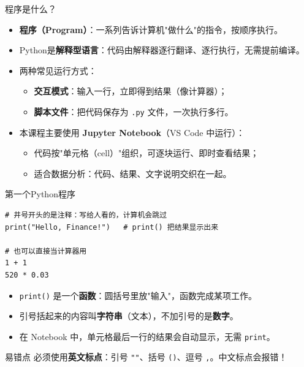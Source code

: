 \documentclass[9pt]{ctexbeamer}
\begin{document}
\begin{frame}{程序是什么？}
	\begin{itemize}
		\item \textbf{程序（Program）}：一系列告诉计算机"做什么"的指令，按顺序执行。
		\item Python是\textbf{解释型语言}：代码由解释器逐行翻译、逐行执行，无需提前编译。
		\item 两种常见运行方式：
		\begin{itemize}
			\item \textbf{交互模式}：输入一行，立即得到结果（像计算器）；
			\item \textbf{脚本文件}：把代码保存为 \texttt{.py} 文件，一次执行多行。
		\end{itemize}
		\item 本课程主要使用 \textbf{Jupyter Notebook}（VS Code 中运行）：
		\begin{itemize}
			\item 代码按"单元格（cell）"组织，可逐块运行、即时查看结果；
			\item 适合数据分析：代码、结果、文字说明交织在一起。
		\end{itemize}
	\end{itemize}
\end{frame}

\begin{frame}[fragile]{第一个Python程序}
	\begin{lstlisting}
# 井号开头的是注释：写给人看的，计算机会跳过
print("Hello, Finance!")   # print() 把结果显示出来

# 也可以直接当计算器用
1 + 1
520 * 0.03
\end{lstlisting}
	\begin{itemize}
		\item \texttt{print()} 是一个\textbf{函数}：圆括号里放"输入"，函数完成某项工作。
		\item 引号括起来的内容叫\textbf{字符串}（文本），不加引号的是\textbf{数字}。
		\item 在 Notebook 中，单元格最后一行的结果会自动显示，无需 \texttt{print}。
	\end{itemize}
	\begin{alertblock}{易错点}
		必须使用\textbf{英文标点}：引号 \texttt{""}、括号 \texttt{()}、逗号 \texttt{,}。中文标点会报错！
	\end{alertblock}
\end{frame}
\end{document}
